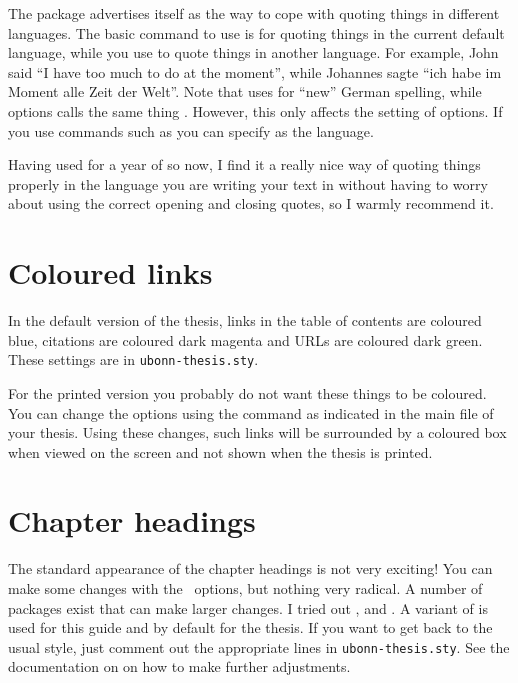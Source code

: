 The  package advertises itself as the way to cope
with quoting things in different languages. The basic
command to use is  for quoting things in the current default language, while you
use  to quote things in another language. For
example, John said \enquote{I have too much to do at the moment},
while \foreignlanguage{ngerman}{Johannes sagte}
\foreignquote{ngerman}{ich habe im Moment alle Zeit der Welt}. Note
that  uses  for \enquote{new} German
spelling, while  options calls the same thing
. However, this only affects the setting of options. If
you use commands such as  you can specify
 as the language.

Having used  for a year of so now, I find it a
really nice way of quoting things properly in the language you are
writing your text in without having to worry about using the correct
opening and closing quotes, so I warmly recommend it.


\section{Coloured links}
\label{sec:layout:link}

In the default version of the thesis, links in the table of contents
are coloured blue, citations are coloured dark magenta and URLs are
coloured dark green. These settings are in \texttt{ubonn-thesis.sty}.

For the printed version you probably do not want these things to be
coloured. You can change the  options using the
 command as indicated in the main file of your
thesis. Using these changes, such links will be surrounded by a
coloured box when viewed on the screen and not shown when the thesis
is printed.

\section{Chapter headings}
\label{sec:layout:chapter}

The standard appearance of the chapter headings is not very exciting!
You can make some changes with the \KOMAScript\ options, but nothing
very radical. A number of packages exist that can make larger
changes. I tried out ,  and
. A variant of  is used for this
guide and by default for the thesis. If you want to get back to the
usual style, just comment out the appropriate lines in
\texttt{ubonn-thesis.sty}. See the documentation on
 on how to make further adjustments.

